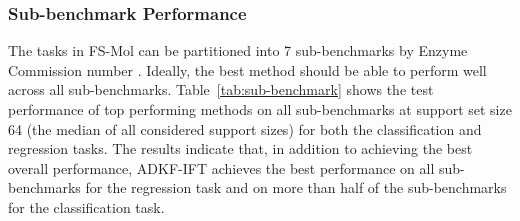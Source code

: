         \subsubsection{Sub-benchmark Performance}
        The tasks in FS-Mol can be partitioned into 7 sub-benchmarks by Enzyme Commission number
        \citep{Webb92enzymenomenclature}.
        Ideally, the best method should be able to perform well across all sub-benchmarks.
        Table~\ref{tab:sub-benchmark} shows the test performance of top performing methods
        on all sub-benchmarks at support set size 64 (the median of all considered support sizes)
        for both the classification and regression tasks. The results indicate that,
        in addition to achieving the best overall performance, ADKF-IFT achieves the best performance
        on all sub-benchmarks for the regression task and on more than half of the sub-benchmarks
        for the classification task.
